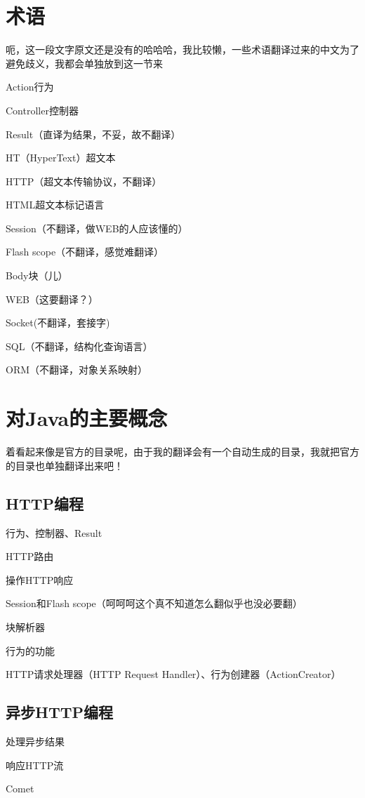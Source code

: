 \documentclass[letterpaper,10pt,english]{sphinxmanual}
\begin{document}
\chapter{术语}
\label{\detokenize{index:id3}}
呃，这一段文字原文还是没有的哈哈哈，我比较懒，一些术语翻译过来的中文为了避免歧义，我都会单独放到这一节来

Action行为

Controller控制器

Result（直译为结果，不妥，故不翻译）

HT（HyperText）超文本

HTTP（超文本传输协议，不翻译）

HTML超文本标记语言

Session（不翻译，做WEB的人应该懂的）

Flash scope（不翻译，感觉难翻译）

Body块（儿）

WEB（这要翻译？）

Socket(不翻译，套接字)

SQL（不翻译，结构化查询语言）

ORM（不翻译，对象关系映射）


\chapter{对Java的主要概念}
\label{\detokenize{index:java}}
着看起来像是官方的目录呢，由于我的翻译会有一个自动生成的目录，我就把官方的目录也单独翻译出来吧！


\section{HTTP编程}
\label{\detokenize{index:http}}
行为、控制器、Result

HTTP路由

操作HTTP响应

Session和Flash scope（呵呵呵这个真不知道怎么翻似乎也没必要翻）

块解析器

行为的功能

HTTP请求处理器（HTTP Request Handler）、行为创建器（ActionCreator）


\section{异步HTTP编程}
\label{\detokenize{index:id4}}
处理异步结果

响应HTTP流

Comet
\end{document}
